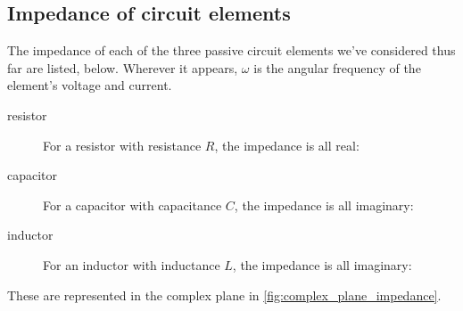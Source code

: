 \documentclass[electronics.tex]{subfiles}
\begin{document}
\subsection{Impedance of circuit elements}
\tags{}

The impedance of each of the three passive circuit elements we've considered thus far are listed, below.
Wherever it appears, $\omega$ is the angular frequency of the element's voltage and current.
\begin{description}
	\item[resistor] For a resistor with resistance $R$, the impedance is all real:
	\item[capacitor] For a capacitor with capacitance $C$, the impedance is all imaginary:
	\item[inductor] For an inductor with inductance $L$, the impedance is all imaginary:
\end{description}
These are represented in the complex plane in \autoref{fig:complex_plane_impedance}.
\end{document}

